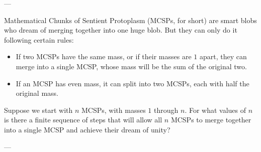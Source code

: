 
---

Mathematical Chunks of Sentient Protoplasm (MCSPs, for short) are smart blobs who dream of merging together into one huge blob. But they can only do it following certain rules:
\begin{itemize}
    \item If two MCSPs have the same mass, or if their masses are $1$ apart, they can merge into a single MCSP, whose mass will be the sum of the original two.

    \item If an MCSP has even mass, it can split into two MCSPs, each with half the original mass.
\end{itemize}
Suppose we start with $n$ MCSPs, with masses $1$ through $n$. For what values of $n$ is there a finite sequence of steps that will allow all $n$ MCSPs to merge together into a single MCSP and achieve their dream of unity?

---

